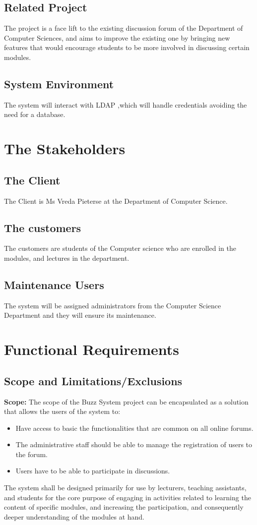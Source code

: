 \documentclass[11pt]{article}
\begin{document}
\subsection{Related Project}
The project is a face lift to the existing discussion forum of the Department of Computer Sciences, and aims to improve the existing one by bringing new features that would encourage students to be more involved in discussing certain modules.
\subsection{System Environment}
The system will interact with LDAP ,which will handle credentials avoiding the need for a database.

\section{The Stakeholders}

\subsection{The Client}
The Client is Ms Vreda Pieterse at the Department of Computer Science.
\subsection{The customers}
The customers are students of the Computer science who are enrolled in the modules, and lectures in the department.
\subsection{Maintenance Users}
The system will be assigned administrators from the Computer Science Department and they will ensure its maintenance.

\newpage
\section{Functional Requirements}
\subsection{Scope and Limitations/Exclusions}
\textbf{Scope: } \newline
The scope of the Buzz System project can be encapsulated as a solution that allows the users of the system to:
\begin{itemize}
\item Have access to basic the functionalities that are common on all online forums.
\item The administrative staff should be able to manage the registration of users to the forum.
\item Users have to be able to participate in discussions. 
\end{itemize}
The system shall be designed primarily for use by lecturers, teaching
assistants, and students for the core purpose of engaging in activities related to learning the content of specific modules, and increasing the participation, and consequently deeper understanding of the modules at hand. \newline
\end{document}
